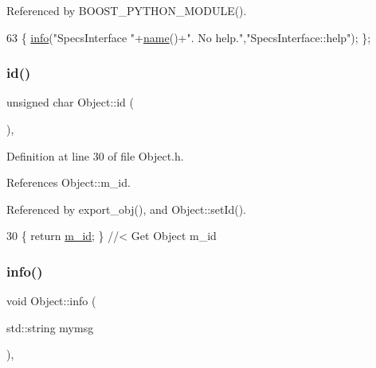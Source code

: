 Referenced by B\+O\+O\+S\+T\+\_\+\+P\+Y\+T\+H\+O\+N\+\_\+\+M\+O\+D\+U\+L\+E().


\begin{DoxyCode}
63 \{ \hyperlink{classObject_a644fd329ea4cb85f54fa6846484b84a8}{info}(\textcolor{stringliteral}{"SpecsInterface "}+\hyperlink{classObject_a300f4c05dd468c7bb8b3c968868443c1}{name}()+\textcolor{stringliteral}{". No help."},\textcolor{stringliteral}{"SpecsInterface::help"}); \};
\end{DoxyCode}
\mbox{\label{classObject_af99145335cc61ff6e2798ea17db009d2}} 
\subsubsection{\texorpdfstring{id()}{id()}}
{\footnotesize\ttfamily unsigned char Object\+::id (\begin{DoxyParamCaption}{ }\end{DoxyParamCaption})\hspace{0.3cm}{\ttfamily [inline]}, {\ttfamily [inherited]}}



Definition at line 30 of file Object.\+h.



References Object\+::m\+\_\+id.



Referenced by export\+\_\+obj(), and Object\+::set\+Id().


\begin{DoxyCode}
30 \{ \textcolor{keywordflow}{return} \hyperlink{classObject_aca74b9dbfed7b5556ea2d56c65b6b6b0}{m\_id};         \} \textcolor{comment}{//< Get Object m\_id }
\end{DoxyCode}
\mbox{\label{classObject_a644fd329ea4cb85f54fa6846484b84a8}} 
\subsubsection{\texorpdfstring{info()}{info()}\hspace{0.1cm}{\footnotesize\ttfamily [1/2]}}
{\footnotesize\ttfamily void Object\+::info (\begin{DoxyParamCaption}\item[{std\+::string}]{mymsg }\end{DoxyParamCaption})\hspace{0.3cm}{\ttfamily [inline]}, {\ttfamily [inherited]}}



